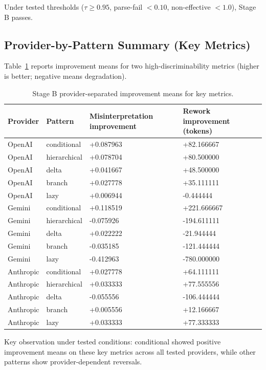 \documentclass[11pt,a4paper]{article}
\begin{document}
Under tested thresholds ($\tau\geq0.95$, parse-fail $<0.10$, non-effective $<1.0$), Stage B passes.

\subsection{Provider-by-Pattern Summary (Key Metrics)}

Table~\ref{tab:stageb_key} reports improvement means for two high-discriminability metrics (higher is better; negative means degradation).

\begin{table}[h]
\centering
\small
\begin{tabular}{llll}
\toprule
Provider & Pattern & Misinterpretation improvement & Rework improvement (tokens) \\
\midrule
OpenAI & conditional & +0.087963 & +82.166667 \\
OpenAI & hierarchical & +0.078704 & +80.500000 \\
OpenAI & delta & +0.041667 & +48.500000 \\
OpenAI & branch & +0.027778 & +35.111111 \\
OpenAI & lazy & +0.006944 & -0.444444 \\
\midrule
Gemini & conditional & +0.118519 & +221.666667 \\
Gemini & hierarchical & -0.075926 & -194.611111 \\
Gemini & delta & +0.022222 & -21.944444 \\
Gemini & branch & -0.035185 & -121.444444 \\
Gemini & lazy & -0.412963 & -780.000000 \\
\midrule
Anthropic & conditional & +0.027778 & +64.111111 \\
Anthropic & hierarchical & +0.033333 & +77.555556 \\
Anthropic & delta & -0.055556 & -106.444444 \\
Anthropic & branch & +0.005556 & +12.166667 \\
Anthropic & lazy & +0.033333 & +77.333333 \\
\bottomrule
\end{tabular}
\caption{Stage B provider-separated improvement means for key metrics.}
\label{tab:stageb_key}
\end{table}

Key observation under tested conditions: conditional showed positive improvement means on these key metrics across all tested providers, while other patterns show provider-dependent reversals.
\end{document}
